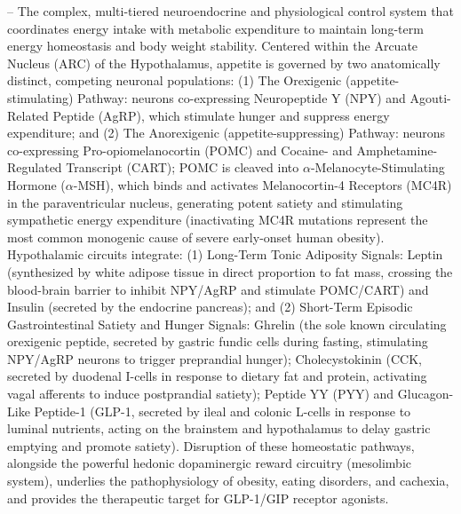 -- The complex, multi-tiered neuroendocrine and physiological control system that coordinates energy intake with metabolic expenditure to maintain long-term energy homeostasis and body weight stability. Centered within the Arcuate Nucleus (ARC) of the Hypothalamus, appetite is governed by two anatomically distinct, competing neuronal populations: (1) The Orexigenic (appetite-stimulating) Pathway: neurons co-expressing Neuropeptide Y (NPY) and Agouti-Related Peptide (AgRP), which stimulate hunger and suppress energy expenditure; and (2) The Anorexigenic (appetite-suppressing) Pathway: neurons co-expressing Pro-opiomelanocortin (POMC) and Cocaine- and Amphetamine-Regulated Transcript (CART); POMC is cleaved into $\alpha$-Melanocyte-Stimulating Hormone ($\alpha$-MSH), which binds and activates Melanocortin-4 Receptors (MC4R) in the paraventricular nucleus, generating potent satiety and stimulating sympathetic energy expenditure (inactivating MC4R mutations represent the most common monogenic cause of severe early-onset human obesity). Hypothalamic circuits integrate: (1) Long-Term Tonic Adiposity Signals: Leptin (synthesized by white adipose tissue in direct proportion to fat mass, crossing the blood-brain barrier to inhibit NPY/AgRP and stimulate POMC/CART) and Insulin (secreted by the endocrine pancreas); and (2) Short-Term Episodic Gastrointestinal Satiety and Hunger Signals: Ghrelin (the sole known circulating orexigenic peptide, secreted by gastric fundic cells during fasting, stimulating NPY/AgRP neurons to trigger preprandial hunger); Cholecystokinin (CCK, secreted by duodenal I-cells in response to dietary fat and protein, activating vagal afferents to induce postprandial satiety); Peptide YY (PYY) and Glucagon-Like Peptide-1 (GLP-1, secreted by ileal and colonic L-cells in response to luminal nutrients, acting on the brainstem and hypothalamus to delay gastric emptying and promote satiety). Disruption of these homeostatic pathways, alongside the powerful hedonic dopaminergic reward circuitry (mesolimbic system), underlies the pathophysiology of obesity, eating disorders, and cachexia, and provides the therapeutic target for GLP-1/GIP receptor agonists.

